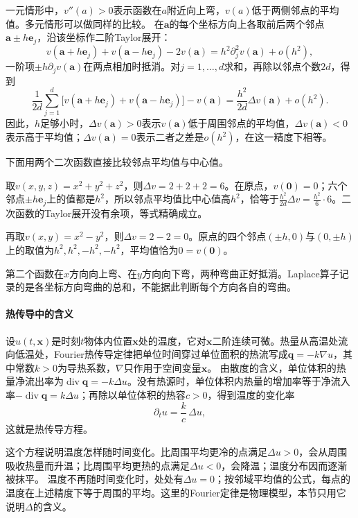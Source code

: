 一元情形中，$v''(a)>0$表示函数在$a$附近向上弯，$v(a)$低于两侧邻点的平均值。多元情形可以做同样的比较。
在$\bm a$的每个坐标方向上各取前后两个邻点$\bm a\pm h\bm e_j$，沿该坐标作二阶Taylor展开：
\[
 v(\bm a+h\bm e_j)+v(\bm a-h\bm e_j)-2v(\bm a)=h^2\partial_j^2v(\bm a)+o(h^2),
\]
一阶项$\pm h\partial_jv(\bm a)$在两点相加时抵消。对$j=1,\ldots,d$求和，再除以邻点个数$2d$，得到
\[
 \frac1{2d}\sum_{j=1}^d\bigl[v(\bm a+h\bm e_j)+v(\bm a-h\bm e_j)\bigr]-v(\bm a)
 =\frac{h^2}{2d}\Delta v(\bm a)+o(h^2).
\]
因此，$h$足够小时，$\Delta v(\bm a)>0$表示$v(\bm a)$低于周围邻点的平均值，$\Delta v(\bm a)<0$表示高于平均值；$\Delta v(\bm a)=0$表示二者之差是$o(h^2)$，在这一精度下相等。

下面用两个二次函数直接比较邻点平均值与中心值。
\begin{example}[二次函数的邻点平均]
取$v(x,y,z)=x^2+y^2+z^2$，则$\Delta v=2+2+2=6$。在原点，$v(\bm0)=0$；六个邻点$\pm h\bm e_j$上的值都是$h^2$，所以邻点平均值比中心值高$h^2$，恰等于$\frac{h^2}{2d}\Delta v=\frac{h^2}6\cdot6$。二次函数的Taylor展开没有余项，等式精确成立。

再取$v(x,y)=x^2-y^2$，则$\Delta v=2-2=0$。原点的四个邻点$(\pm h,0)$与$(0,\pm h)$上的取值为$h^2,h^2,-h^2,-h^2$，平均值恰为$0=v(\bm0)$。
\end{example}
第二个函数在$x$方向向上弯、在$y$方向向下弯，两种弯曲正好抵消。Laplace算子记录的是各坐标方向弯曲的总和，不能据此判断每个方向各自的弯曲。

\paragraph{热传导中的含义}

设$u(t,\bm x)$是时刻$t$物体内位置$\bm x$处的温度，它对$\bm x$二阶连续可微。热量从高温处流向低温处，Fourier热传导定律把单位时间穿过单位面积的热流写成$\bm q=-k\nabla u$，其中常数$k>0$为导热系数，$\nabla$只作用于空间变量$\bm x$。
由散度的含义，单位体积的热量净流出率为$\operatorname{div}\bm q=-k\Delta u$。没有热源时，单位体积内热量的增加率等于净流入率$-\operatorname{div}\bm q=k\Delta u$；再除以单位体积的热容$c>0$，得到温度的变化率
\[
 \partial_tu=\frac kc\,\Delta u,
\]
这就是热传导方程。

这个方程说明温度怎样随时间变化。比周围平均更冷的点满足$\Delta u>0$，会从周围吸收热量而升温；比周围平均更热的点满足$\Delta u<0$，会降温；温度分布因而逐渐被抹平。
温度不再随时间变化时，处处有$\Delta u=0$；按邻域平均值的公式，每点的温度在上述精度下等于周围的平均。这里的Fourier定律是物理模型，本节只用它说明$\Delta$的含义。

